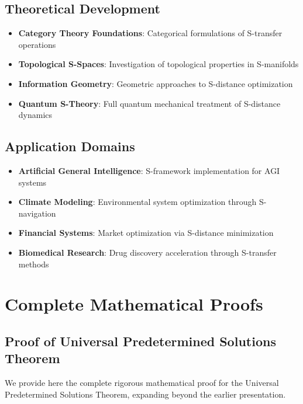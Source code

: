 \documentclass[11pt]{article}
\theoremstyle{definition}
\theoremstyle{remark}
\begin{document}
\subsection{Theoretical Development}

\begin{itemize}
\item \textbf{Category Theory Foundations}: Categorical formulations of S-transfer operations
\item \textbf{Topological S-Spaces}: Investigation of topological properties in S-manifolds
\item \textbf{Information Geometry}: Geometric approaches to S-distance optimization
\item \textbf{Quantum S-Theory}: Full quantum mechanical treatment of S-distance dynamics
\end{itemize}

\subsection{Application Domains}

\begin{itemize}
\item \textbf{Artificial General Intelligence}: S-framework implementation for AGI systems
\item \textbf{Climate Modeling}: Environmental system optimization through S-navigation
\item \textbf{Financial Systems}: Market optimization via S-distance minimization
\item \textbf{Biomedical Research}: Drug discovery acceleration through S-transfer methods
\end{itemize}

\section{Complete Mathematical Proofs}

\subsection{Proof of Universal Predetermined Solutions Theorem}
\label{proof:predetermined_solutions_complete}

We provide here the complete rigorous mathematical proof for the Universal Predetermined Solutions Theorem, expanding beyond the earlier presentation.
\end{document}
